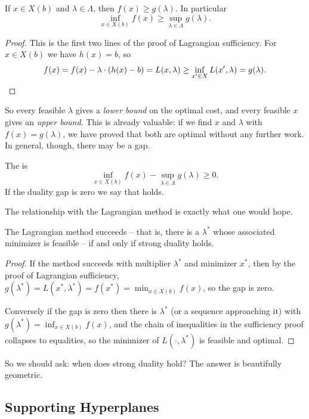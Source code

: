 \begin{theorem}
    If $x \in X(b)$ and $\lambda \in \Lambda$, then $f(x) \geq g(\lambda)$. In particular
    $$
    \inf_{x \in X(b)}f(x) \geq \sup_{\lambda \in \Lambda}g(\lambda).
    $$
\end{theorem}
\begin{proof}
    This is the first two lines of the proof of Lagrangian sufficiency. For $x \in X(b)$ we have $h(x) = b$, so
    $$
    f(x) = f(x) - \lambda\cdot(h(x) - b) = L(x, \lambda) \geq \inf_{x' \in X}L(x', \lambda) = g(\lambda). \qedhere
    $$
\end{proof}

So every feasible $\lambda$ gives a \emph{lower bound} on the optimal cost, and every feasible $x$ gives an \emph{upper bound}. This is already valuable: if we find $x$ and $\lambda$ with $f(x) = g(\lambda)$, we have proved that both are optimal without any further work. In general, though, there may be a gap.

\begin{definition}
    The  is
    $$
    \inf_{x \in X(b)}f(x) - \sup_{\lambda \in \Lambda}g(\lambda) \geq 0.
    $$
    If the duality gap is zero we say that  holds.
\end{definition}

The relationship with the Lagrangian method is exactly what one would hope.

\begin{proposition}
    The Lagrangian method succeeds -- that is, there is a $\lambda^*$ whose associated minimizer is feasible -- if and only if strong duality holds.
\end{proposition}
\begin{proof}
    If the method succeeds with multiplier $\lambda^*$ and minimizer $x^*$, then by the proof of Lagrangian sufficiency, $g(\lambda^*) = L(x^*, \lambda^*) = f(x^*) = \min_{x \in X(b)}f(x)$, so the gap is zero.

    Conversely if the gap is zero then there is $\lambda^*$ (or a sequence approaching it) with $g(\lambda^*) = \inf_{x \in X(b)}f(x)$, and the chain of inequalities in the sufficiency proof collapses to equalities, so the minimizer of $L(\cdot, \lambda^*)$ is feasible and optimal.
\end{proof}

So we should ask: when does strong duality hold? The answer is beautifully geometric.

\subsection{Supporting Hyperplanes}

